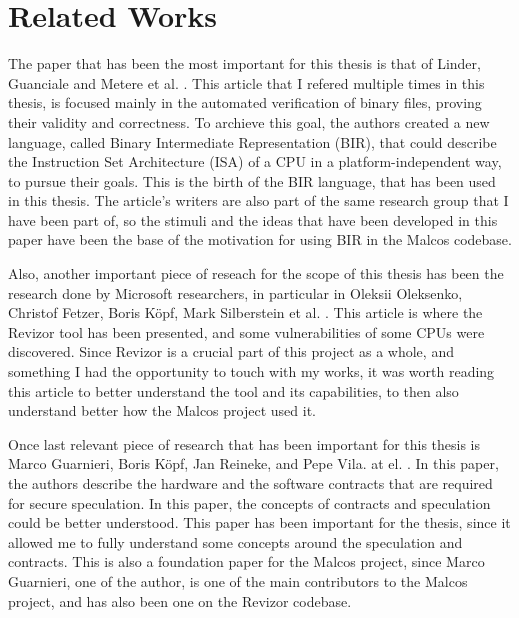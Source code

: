 \chapter{Related Works}
\label{cha:related_works}The paper that has been the most important for this
thesis is that of Linder, Guanciale and Metere et al. \cite{bir_pub}. This article
that I refered multiple times in this thesis, is focused mainly in the automated
verification of binary files, proving their validity and correctness. To
archieve this goal, the authors created a new language, called Binary
Intermediate Representation (BIR), that could describe the Instruction Set Architecture
(ISA) of a CPU in a platform-independent way, to pursue their goals. This is the
birth of the BIR language, that has been used in this thesis. The article's writers
are also part of the same research group that I have been part of, so the
stimuli and the ideas that have been developed in this paper have been the base
of the motivation for using BIR in the Malcos codebase.

Also, another important piece of reseach for the scope of this thesis has been the
research done by Microsoft researchers, in particular in Oleksii Oleksenko, Christof
Fetzer, Boris Köpf, Mark Silberstein et al. \cite{article}. This article is where
the Revizor tool has been presented, and some vulnerabilities of some CPUs were
discovered. Since Revizor is a crucial part of this project as a whole, and
something I had the opportunity to touch with my works, it was worth reading this
article to better understand the tool and its capabilities, to then also
understand better how the Malcos project used it.

Once last relevant piece of research that has been important for this thesis is
Marco Guarnieri, Boris Köpf, Jan Reineke, and Pepe Vila. at el. \cite{contracts_paper}.
In this paper, the authors describe the hardware and the software contracts that
are required for secure speculation. In this paper, the concepts of contracts and
speculation could be better understood. This paper has been important for the
thesis, since it allowed me to fully understand some concepts around the speculation
and contracts. This is also a foundation paper for the Malcos project, since Marco
Guarnieri, one of the author, is one of the main contributors to the Malcos project,
and has also been one on the Revizor codebase.